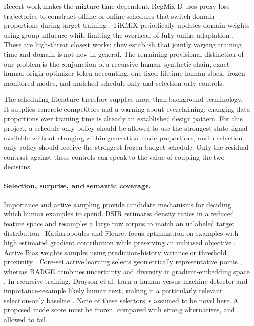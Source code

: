 Recent work makes the mixture time-dependent. RegMix-D uses proxy loss trajectories to construct offline or online schedules that switch domain proportions during target training \cite{zhao2026regmixd}. TiKMiX periodically updates domain weights using group influence while limiting the overhead of fully online adaptation \cite{wang2026tikmix}. These are high-threat closest works: they establish that jointly varying training time and domain is not new in general. The remaining provisional distinction of our problem is the conjunction of a recursive human--synthetic chain, exact human-origin optimizer-token accounting, one fixed lifetime human stock, frozen monitored modes, and matched schedule-only and selection-only controls.

The scheduling literature therefore supplies more than background terminology. It supplies concrete competitors and a warning about overclaiming: changing data proportions over training time is already an established design pattern. For this project, a schedule-only policy should be allowed to use the strongest state signal available without changing within-generation mode proportions, and a selection-only policy should receive the strongest frozen budget schedule. Only the residual contrast against those controls can speak to the value of coupling the two decisions.

\paragraph{Selection, surprise, and semantic coverage.}
Importance and active sampling provide candidate mechanisms for deciding which human examples to spend. DSIR estimates density ratios in a reduced feature space and resamples a large raw corpus to match an unlabeled target distribution \cite{xie2023dsir}. Katharopoulos and Fleuret focus optimization on examples with high estimated gradient contribution while preserving an unbiased objective \cite{katharopoulos2018importance}. Active Bias weights samples using prediction-history variance or threshold proximity \cite{chang2017activebias}. Core-set active learning selects geometrically representative points \cite{sener2018coreset}, whereas BADGE combines uncertainty and diversity in gradient-embedding space \cite{ash2020badge}. In recursive training, Drayson et al. train a human-versus-machine detector and importance-resample likely human text, making it a particularly relevant selection-only baseline \cite{drayson2025machine}. None of these selectors is assumed to be novel here. A proposed mode score must be frozen, compared with strong alternatives, and allowed to fail.

